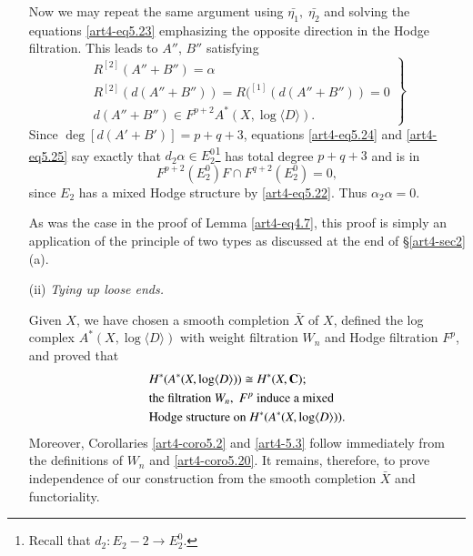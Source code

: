 \begin{enumerate}
Now we may repeat the same argument using $\bar{\eta_1},\; \bar{\eta_2}$ and solving the equations \eqref{art4-eq5.23} emphasizing the opposite direction in the Hodge filtration. This leads to $A''$, $B''$ satisfying
\begin{equation}
\left.
\begin{array}{c}
R^{[2]} (A'' + B'') =\alpha\\
R^{[2]} (d (A''+B'')) = R(^{[1]} (d (A''+B'')) =0\\
d(A''+B'') \in F^{p+2} A^\ast (X, \log \langle D \rangle).
\end{array}
\right\} \label{art4-eq5.24}
\end{equation}
Since $\deg [d(A'+ B')] = p + q +3$, equations \eqref{art4-eq5.24} and \eqref{art4-eq5.25} say exactly that $d_2 \alpha \in E^0_2$\footnote[23]{Recall that $d_2 : E_2 -2 \to E^0_2$.} has total degree $p+q+3$ and is in 
$$
F^{p+2} (E^0_2) F \cap F^{q+2} (E^0_2) = 0,
$$
since $E_2$ has a mixed Hodge structure by \eqref{art4-eq5.22}. Thus $\alpha_2 \alpha = 0$.

\begin{remark*}
As was the case in the proof of Lemma \eqref{art4-eq4.7}, this proof is simply an application of the principle of two types as discussed at the end of \S \ref{art4-sec2} (a).
\end{remark*}

\item[(ii)] \textit{Tying up loose ends.}

Given $X$, we have chosen a smooth completion $\bar{X}$ of $X$, defined the log complex $A^\ast (X, \log \langle D \rangle)$ with weight filtration $W_n$ and Hodge filtration $F^p$, and proved that 
\begin{align*}
& H^\ast (A^\ast (X, \log \langle D \rangle )) \cong H^\ast (X, \mathbf{C});\\
& \text{the filtration $W_n, \; F^p$ induce a mixed} \\
& \text{Hodge structure on $H^\ast (A^\ast (X, \log \langle D \rangle))$.}
\end{align*}\pageoriginale
Moreover, Corollaries \eqref{art4-coro5.2} and \eqref{art4-5.3} follow immediately from the definitions of $W_n$ and \eqref{art4-coro5.20}. It remains, therefore, to prove independence of our construction from the smooth completion $\bar{X}$ and functoriality.


\end{enumerate}

